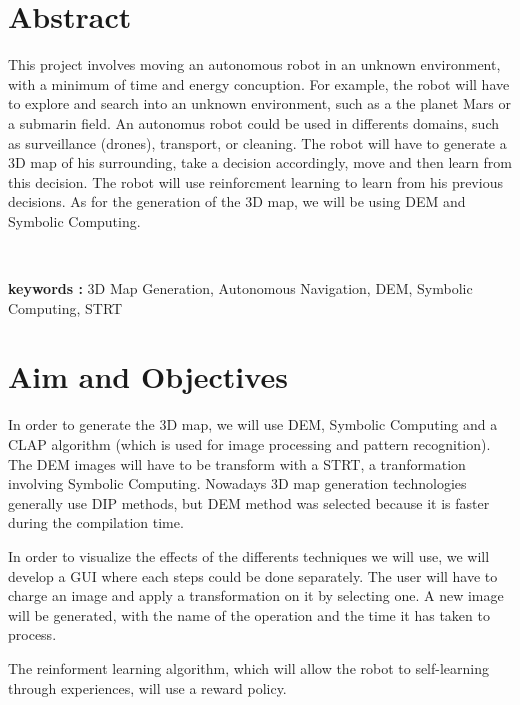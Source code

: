 \documentclass[11pt,a4paper]{article}
\begin{document}
\pagestyle{fancy}		%



\tableofcontents 

\section{Abstract}


This project involves moving an autonomous robot in an unknown environment, with a minimum of time and energy concuption. For example, the robot will have to explore and search into an unknown environment, such as a the planet Mars or a submarin field. An autonomus robot could be used in differents domains, such as  surveillance (drones), transport, or cleaning. The robot will have to generate a 3D map of his surrounding, take a decision accordingly, move and then learn from this decision. The robot will use reinforcment learning to learn from his previous decisions. As for the generation of the 3D map, we will be using \gls{DEM} and Symbolic Computing. 

~~

\textbf{keywords :} 3D Map Generation, Autonomous Navigation, DEM, Symbolic Computing, STRT 


\section{Aim and Objectives}

In order to generate the 3D map, we will use \gls{DEM}, Symbolic Computing and a \gls{CLAP} algorithm (which is used for image processing and pattern recognition). The \gls{DEM} images will have to be transform with a \gls{STRT}, a tranformation involving Symbolic Computing. Nowadays 3D map generation technologies generally use DIP methods, but \gls{DEM} method was selected because it is faster during the compilation time. 


In order to visualize the effects of the differents techniques we will use, we will develop a \gls{GUI} where each steps could be done separately. The user will have to charge an image and apply a transformation on it by selecting one. A new image will be generated, with the name of the operation and the time it has taken to process. 


The reinforment learning algorithm, which will allow the robot to self-learning through experiences, will use a reward policy. 
\end{document}
